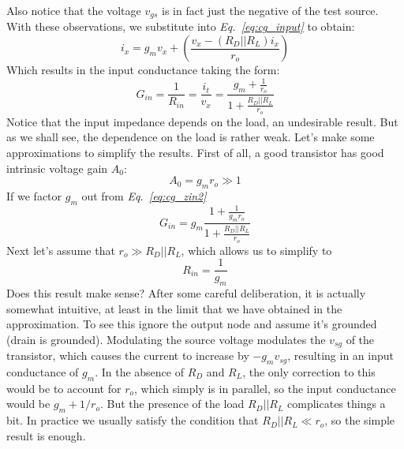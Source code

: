 Also notice that the voltage $v_{gs}$ is in fact just the negative of the test source.  With these observations, we substitute into \emph{Eq.~\ref{eq:cg_input}} to obtain:
    \begin{equation}
        {i_x} = {g_m}{v_x} + \left( {\frac{{{v_x} - \left( {{R_D}||{R_L}} \right){i_x}}}{{{r_o}}}} \right)
    \end{equation}
Which results in the input conductance taking the form:
    \begin{equation}
        G_{in} = \frac{1}{{{R_{in}}}} = \frac{{{i_t}}}{{{v_x}}} = \frac{{{g_m} + \frac{1}{{{r_o}}}}}{{1 + \frac{{{R_D}||{R_L}}}{{{r_o}}}}} \label{eq:cg_zin2}
    \end{equation}
Notice that the input impedance depends on the load, an undesirable result.  But as we shall see, the dependence on the load is rather weak.  Let's make some approximations to simplify the results.  First of all, a good transistor has good intrinsic voltage gain $A_0$: 
    \begin{equation}
        A_0 = g_m r_o \gg 1
    \end{equation}
If we factor $g_m$ out from \emph{Eq.~\ref{eq:cg_zin2}}
    \begin{equation}
        G_{in} = g_m \frac{{1 + \frac{1}{{{g_m r_o}}}}}{{1 + \frac{{{R_D}||{R_L}}}{{{r_o}}}}}
    \end{equation}
Next let's assume that $r_o \gg R_D||R_L$, which allows us to simplify to
    \begin{equation}
        {R_{in}} = \frac{1}{{{g_m}}}
    \end{equation}
Does this result make sense?  After some careful deliberation, it is actually somewhat intuitive, at least in the limit that we have obtained in the approximation.  To see this ignore the output node and assume it's grounded (drain is grounded). Modulating the source voltage modulates the $v_{sg}$ of the transistor, which causes the current to increase by $-g_m v_{sg}$, resulting in an input conductance of $g_m$.  In the absence of $R_D$ and $R_L$, the only correction to this would be to account for $r_o$, which simply is in parallel, so the input conductance would be $g_m + 1/r_o$.  But the presence of the load $R_D || R_L$ complicates things a bit.  In practice we usually satisfy the condition that $R_D || R_L \ll r_o$, so the simple result is enough. 
